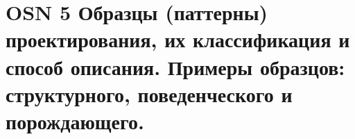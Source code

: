 \section*{OSN 5 Образцы (паттерны) проектирования, их классификация и способ описания. Примеры образцов: структурного, поведенческого и порождающего.}
